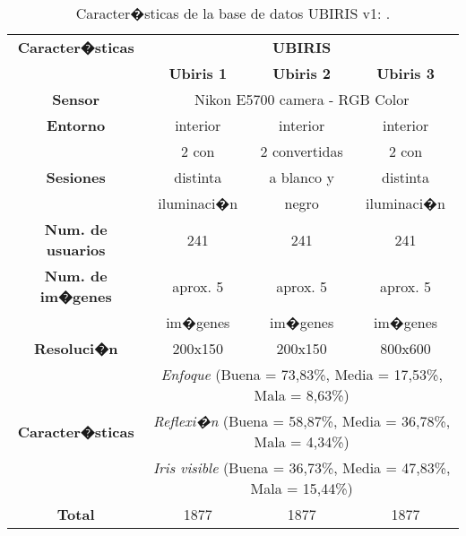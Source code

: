 \begin{table}[h]
    \centering
    \scriptsize
    \begin{tabular}{|c|c|c|c|}
        \hline
        \textbf{Caracter�sticas}   & \multicolumn{3}{|c|}{\textbf{UBIRIS}}            \\
        \cline{2-4}
                                   & \textbf{Ubiris 1}      & \textbf{Ubiris 2}  & \textbf{Ubiris 3}         \\
        \hline
        \textbf{Sensor}            & \multicolumn{3}{|c|}{Nikon E5700 camera - RGB Color}            \\
        \hline
        \textbf{Entorno}           & interior               & interior          & interior         \\
        \hline
                                   & 2 con                  & 2 convertidas     & 2 con          \\
        \textbf{Sesiones}          & distinta               & a blanco y        & distinta         \\
                                   & iluminaci�n            & negro             & iluminaci�n          \\
        \hline
        \textbf{Num. de usuarios}  & 241                    & 241               & 241       \\
        \hline
        \textbf{Num. de im�genes}  & aprox. 5               & aprox. 5          & aprox. 5  \\
                                   & im�genes               & im�genes          & im�genes  \\
        \hline
        \textbf{Resoluci�n}        & 200x150                & 200x150           & 800x600    \\
        \hline
                            & \multicolumn{3}{|c|}{\emph{Enfoque} (Buena = 73,83\%, Media = 17,53\%, Mala = 8,63\%)}\\
        \textbf{Caracter�sticas}   & \multicolumn{3}{|c|}{\emph{Reflexi�n} (Buena = 58,87\%, Media = 36,78\%, Mala = 4,34\%) } \\
                        & \multicolumn{3}{|c|}{\emph{Iris visible} (Buena = 36,73\%, Media = 47,83\%, Mala = 15,44\%)}\\
        \hline
        \textbf{Total}             & 1877                   & 1877              & 1877      \\
        \hline
    \end{tabular}
    \caption{Caracter�sticas de la base de datos UBIRIS v1: \citet{database:UBIRISv1_ProencaAlexandre2005,database:UBIRISv1_web}.}
    \label{table:info_UBIRIS}
\end{table}


